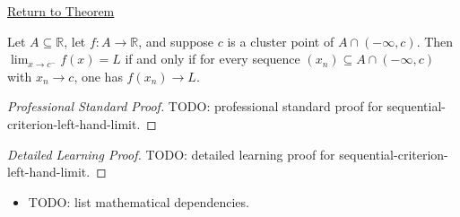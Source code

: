 \newpage
{}
\label{prf:sequential-criterion-left-hand-limit}

\begin{remark*}[Return]
\hyperref[cor:sequential-criterion-left-hand-limit]{Return to Theorem}
\end{remark*}

\begin{theorem*}
Let $A\subseteq\mathbb{R}$, let $f:A\to\mathbb{R}$, and suppose $c$ is a
cluster point of $A\cap(-\infty,c)$. Then $\lim_{x\to c^-}f(x)=L$ if and
only if for every sequence $(x_n)\subseteq A\cap(-\infty,c)$ with
$x_n\to c$, one has $f(x_n)\to L$.

\smallskip\noindent
\end{theorem*}

\begin{proof}[Professional Standard Proof]
\LRAProofBodyStart
TODO: professional standard proof for sequential-criterion-left-hand-limit.
\end{proof}

\begin{proof}[Detailed Learning Proof]
\LRAProofBodyStart
TODO: detailed learning proof for sequential-criterion-left-hand-limit.
\end{proof}

\begin{remark*}
\end{remark*}

\begin{dependencies}
\begin{itemize}
  \item TODO: list mathematical dependencies.
\end{itemize}
\end{dependencies}

\clearpage
